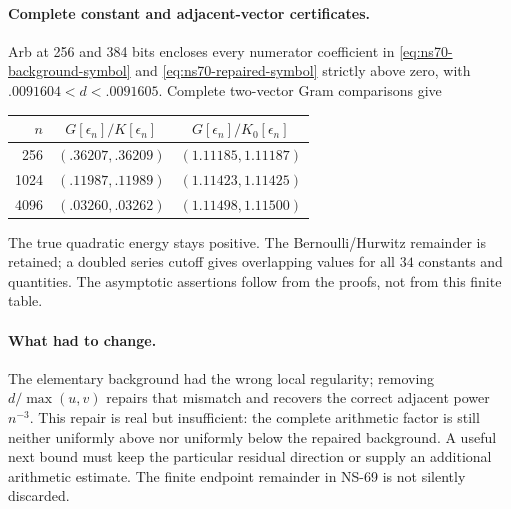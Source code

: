 \paragraph{Complete constant and adjacent-vector certificates.}
Arb at 256 and 384 bits encloses every numerator coefficient in
\eqref{eq:ns70-background-symbol} and
\eqref{eq:ns70-repaired-symbol} strictly above zero, with
$.0091604<d<.0091605$. Complete two-vector Gram comparisons give
\begin{center}\small
\begin{tabular}{rcc}
\toprule
$n$ & $G[\epsilon_n]/K[\epsilon_n]$
    & $G[\epsilon_n]/K_0[\epsilon_n]$\\
\midrule
256 & $(.36207,.36209)$ & $(1.11185,1.11187)$\\
1024 & $(.11987,.11989)$ & $(1.11423,1.11425)$\\
4096 & $(.03260,.03262)$ & $(1.11498,1.11500)$\\
\bottomrule
\end{tabular}\end{center}
The true quadratic energy stays positive. The Bernoulli/Hurwitz
remainder is retained; a doubled series cutoff gives overlapping
values for all $34$ constants and quantities. The asymptotic assertions
follow from the proofs, not from this finite table.

\paragraph{What had to change.}
The elementary background had the wrong local regularity; removing
$d/\max(u,v)$ repairs that mismatch and recovers the correct adjacent
power $n^{-3}$. This repair is real but insufficient: the complete
arithmetic factor is still neither uniformly above nor uniformly below
the repaired background. A useful next bound must keep the particular
residual direction or supply an additional arithmetic estimate. The
finite endpoint remainder in NS-69 is not silently discarded.
